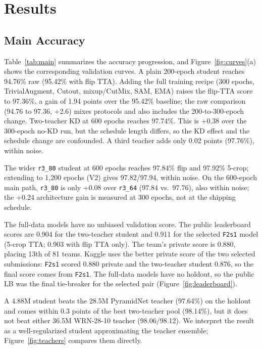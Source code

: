 \section{Results}
\label{sec:results}

\subsection{Main Accuracy}

Table~\ref{tab:main} summarizes the accuracy progression, and
Figure~\ref{fig:curves}(a) shows the corresponding validation curves. A plain
200-epoch student reaches 94.76\% raw (95.42\% with flip TTA). Adding the full
training recipe (300 epochs, TrivialAugment, Cutout, mixup/CutMix, SAM, EMA)
raises the flip-TTA score to 97.36\%, a gain of 1.94 points over the 95.42\%
baseline; the raw comparison (94.76 to 97.36, +2.6) mixes protocols and also
includes the 200-to-300-epoch change. Two-teacher KD at 600 epochs reaches
97.74\%. This is +0.38 over the 300-epoch no-KD run, but the schedule length
differs, so the KD effect and the schedule change are confounded. A third teacher adds only 0.02 points (97.76\%), within noise.

The wider \texttt{r3\_80} student at 600 epochs reaches 97.84\% flip and 97.92\%
5-crop; extending to 1,200 epochs (V2) gives 97.82/97.94, within noise. On the
600-epoch main path, \texttt{r3\_80} is only +0.08 over \texttt{r3\_64}
(97.84 vs.\ 97.76), also within noise; the +0.24 architecture gain is measured
at 300 epochs, not at the shipping schedule.

The full-data models have no unbiased validation score. The public leaderboard
scores are 0.904 for the two-teacher student and 0.911 for the selected
\texttt{F2s1} model (5-crop TTA; 0.903 with flip TTA only). The team's private
score is 0.880, placing 13th of 81 teams. Kaggle uses the better private score of the two
selected submissions: \texttt{F2s1} scored 0.880 private and the two-teacher student 0.876,
so the final score comes from \texttt{F2s1}. The full-data models have no holdout, so the
public LB was the final tie-breaker for the selected pair
(Figure~\ref{fig:leaderboard}).

A 4.88M student beats the 28.5M PyramidNet teacher (97.64\%) on the holdout and
comes within 0.3 points of the best two-teacher pool (98.14\%), but it does not
beat either 36.5M WRN-28-10 teacher (98.06/98.12). We interpret the result as a
well-regularized student approximating the teacher ensemble;
Figure~\ref{fig:teachers} compares them directly.

